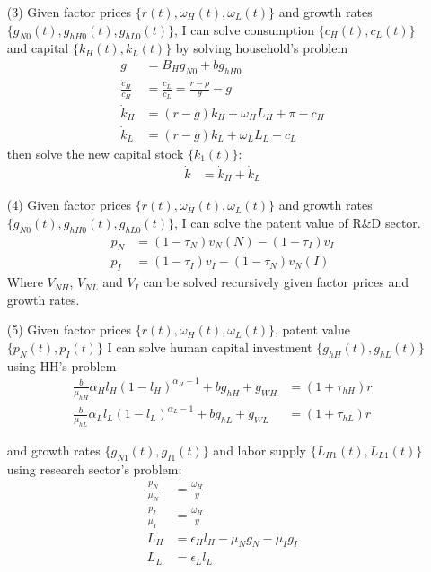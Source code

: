 \documentclass[12pt]{article}
\begin{document}
\begin{itemize}
\item[(3)] Given factor prices $\{r(t),\omega_H(t),\omega_L(t)\}$ and growth rates $\{g_{N0}(t),g_{hH0}(t),g_{hL0}(t)\}$, I can solve consumption $\{c_H(t),c_L(t)\}$ and capital $\{k_H(t),k_L(t)\}$ by solving household's problem
\begin{align*}
g &= B_Hg_{N0}+bg_{hH0} \\
\frac{\dot{c}_H}{c_H} &= \frac{\dot{c}_L}{c_L} = \frac{r-\rho}{\theta}-g \\
\dot{k}_H &= (r-g)k_H+\omega_HL_H+\pi-c_H \\
\dot{k}_L &=  (r-g)k_L+\omega_L L_L-c_L
\end{align*}
then solve the new capital stock $\{k_1(t)\}$:
\begin{align*}
\dot{k} &= \dot{k}_H+ \dot{k}_L
\end{align*}

\item[(4)] Given factor prices $\{r(t),\omega_H(t),\omega_L(t)\}$ and growth rates $\{g_{N0}(t),g_{hH0}(t),g_{hL0}(t)\}$, I can solve the patent value of R\&D sector. 
\begin{align*}
p_N &= (1-\tau_N)v_N(N)-(1-\tau_I)v_I\\
p_I &= (1-\tau_I)v_I-(1-\tau_N)v_N(I) 
\end{align*}
Where $V_{NH}$, $V_{NL}$ and $V_I$ can be solved recursively given factor prices and growth rates. 


\item[(5)] Given factor prices $\{r(t),\omega_H(t),\omega_L(t)\}$, patent value $\{p_N(t),p_I(t)\}$ I can solve human capital investment $\{g_{hH}(t), g_{hL}(t)\}$ using HH's problem
\begin{align*}
\frac{b}{\mu_{hH}}\alpha_Hl_H(1-l_H)^{\alpha_H-1}+bg_{hH}+g_{WH} &= (1+\tau_{hH})r\\
\frac{b}{\mu_{hL}}\alpha_Ll_L(1-l_L)^{\alpha_L-1}+bg_{hL}+g_{WL} &= (1+\tau_{hL})r
\end{align*}

and growth rates $\{g_{N1}(t), g_{I1}(t)\}$ and labor supply $\{L_{H1}(t), L_{L1}(t)\}$ using research sector's problem: 
\begin{align*}
\frac{p_N}{\mu_N} &= \frac{\omega_H}{y}  \\
\frac{p_I}{\mu_I} &= \frac{\omega_H}{y}  \\
L_H &=\epsilon_H l_H-\mu_Ng_N-\mu_Ig_I \\
L_L &=\epsilon_L l_L
\end{align*}


\end{itemize}
\end{document}

